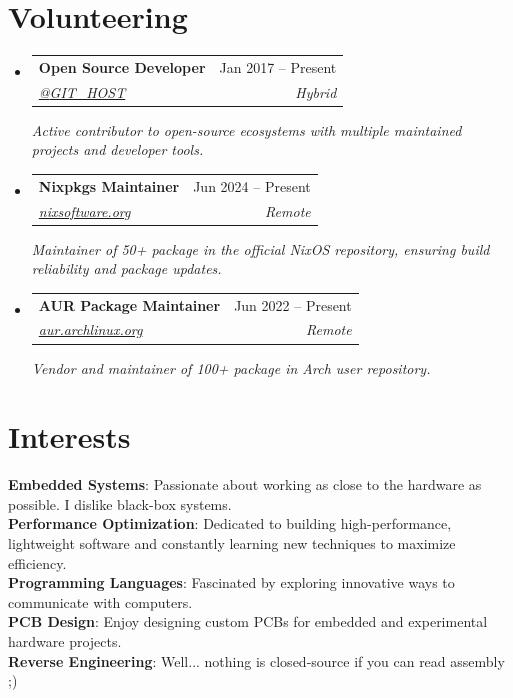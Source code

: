 \documentclass[letterpaper,11pt]{article}
\makeatletter
\newcommand{\githosting} {@{GIT_HOST}}
\newcommand{\githostingurl} {https://\githosting}
\newcommand{\resumeSubheadingExp}[5]{
  \vspace{-2pt}\item
    \begin{tabular*}{0.97\textwidth}[t]{l@{\extracolsep{\fill}}r}
      \textbf{\color{primary}#1} & \color{primary}#2 \\
      \textit{\small\color{primary}#3} & \textit{\small\color{primary}#4} \\
    \end{tabular*}
    \vspace{-2pt}\hspace{6pt}\textit{\small\color{primary}#5}
    \vspace{-4pt}
}
\newcommand{\resumeSubHeadingListStart}{\begin{itemize}[leftmargin=0.15in, label={}]}
\newcommand{\resumeSubHeadingListEnd}{\end{itemize}}
\makeatother
\begin{document}
 \section{Volunteering}
  \resumeSubHeadingListStart
    \resumeSubheadingExp
        {Open Source Developer}{Jan 2017 -- Present}
        {\href{\githostingurl}{\githosting}}{Hybrid}
        {Active contributor to open-source ecosystems with multiple maintained projects and developer tools.}
    \resumeSubheadingExp
        {Nixpkgs Maintainer}{Jun 2024 -- Present}
        {\href{https://nixsoftware.org/en/maintainers/0x61nas}{nixsoftware.org}}{Remote}
        {Maintainer of 50+ package in the official NixOS repository, ensuring build reliability and package updates.}
    \resumeSubheadingExp
        {AUR Package Maintainer}{Jun 2022 -- Present}
        {\href{https://aur.archlinux.org/packages?SeB=m\&K=anelgarhy\&O=0\&SB=l\&SO=d}{aur.archlinux.org}}{Remote}
        {Vendor and maintainer of 100+ package in Arch user repository.}
  \resumeSubHeadingListEnd

 \section{Interests}
 \begin{itemize}[leftmargin=0.15in, label={}]
    \small{\item{
        \textbf{Embedded Systems}{: Passionate about working as close to the hardware as possible. I dislike black-box systems.} \\
        \textbf{Performance Optimization}{: Dedicated to building high-performance, lightweight software and constantly learning new techniques to maximize efficiency.} \\
        \textbf{Programming Languages}{: Fascinated by exploring innovative ways to communicate with computers.} \\
        \textbf{PCB Design}{: Enjoy designing custom PCBs for embedded and experimental hardware projects.} \\
        \textbf{Reverse Engineering}{: Well... nothing is closed-source if you can read assembly ;)}
    }}
 \end{itemize}
\end{document}

